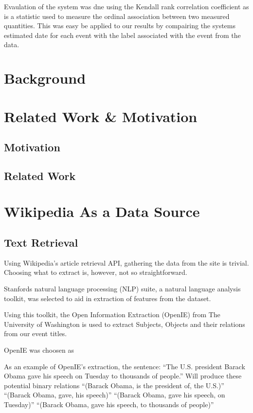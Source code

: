 \documentclass[bsc,frontabs,twoside,singlespacing,parskip,deptreport]{infthesis}     %
\begin{document}
Evaulation of the system was dne using the
Kendall rank correlation coefficient as is a statistic
used to measure the ordinal association between two
measured quantities. This was easy be applied to our results
by compairing the systems estimated date for each event
with the label associated with the event from the data.

\chapter{Background}

\chapter{Related Work \& Motivation}
\section{Motivation}
\section{Related Work}


\chapter{Wikipedia As a Data Source}
\section{Text Retrieval}
Using Wikipedia's article retrieval API, gathering the data from
the site is trivial. Choosing what to extract is, however, not
so straightforward.

Stanfords natural language processing (NLP) suite,
a natural language analysis toolkit,
was selected to aid in extraction of features from the dataset.

Using this toolkit, the Open Information Extraction (OpenIE) from
The University of Washington is used to extract Subjects, Objects
and their relations from our event titles.

OpenIE was choosen as %

As an example of OpenIE's extraction, the sentence:
``The U.S. president Barack Obama gave his speech on Tuesday to thousands of people.''
Will produce these potential binary relations
``(Barack Obama, is the president of, the U.S.)''
``(Barack Obama, gave, his speech)''
``(Barack Obama, gave his speech, on Tuesday)''
``(Barack Obama, gave his speech, to thousands of people)''
\end{document}
